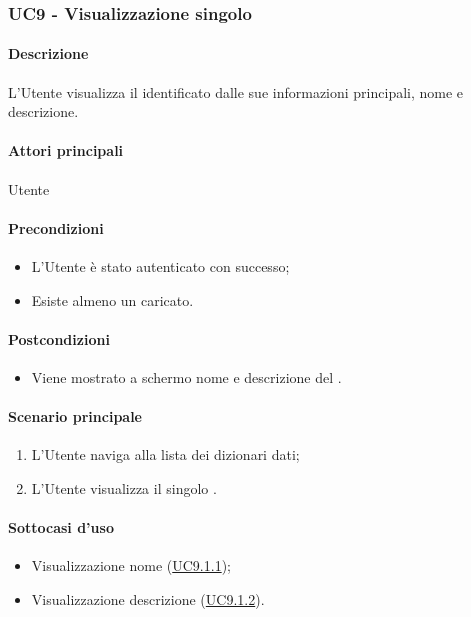 \subsubsection{UC9 - Visualizzazione singolo }\label{UC9}
\paragraph*{Descrizione}
L’Utente visualizza il  identificato dalle sue informazioni principali, nome e descrizione.

\paragraph*{Attori principali}
Utente

\paragraph*{Precondizioni}
\begin{itemize}
  \item L’Utente è stato autenticato con successo;
  \item Esiste almeno un  caricato.  
\end{itemize}

\paragraph*{Postcondizioni}
\begin{itemize}
  \item Viene mostrato a schermo nome e descrizione del .
\end{itemize}

\paragraph*{Scenario principale}
\begin{enumerate}
  \item L’Utente naviga alla lista dei dizionari dati;
  \item L’Utente visualizza il singolo .
\end{enumerate}

\paragraph*{Sottocasi d'uso}
\begin{itemize}
  \item Visualizzazione nome  (\hyperref[UC9point1point1]{UC9.1.1});
  \item Visualizzazione descrizione  (\hyperref[UC9point1point2]{UC9.1.2}).
\end{itemize}

